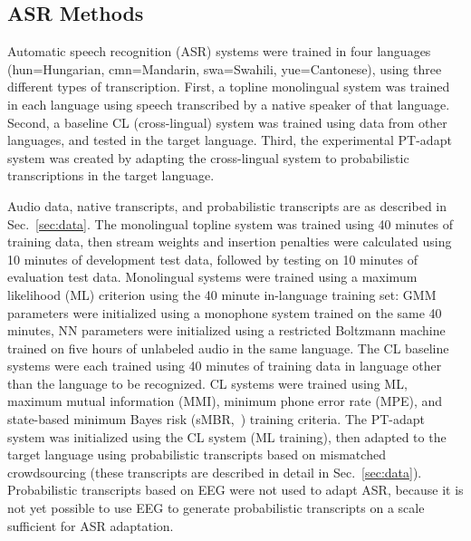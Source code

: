 \subsection{ASR Methods}
\label{sec:mlbaseline}

{\color{blue} Automatic speech recognition (ASR) systems were trained
  in four languages (hun=Hungarian, cmn=Mandarin, swa=Swahili,
  yue=Cantonese), using three different types of transcription.
  First, a topline {\sc monolingual} system was trained in each
  language using speech transcribed by a native speaker of that
  language.  Second, a baseline {\sc CL} (cross-lingual) system was
  trained using data from other languages, and tested in the target
  language.  Third, the experimental {\sc PT-adapt} system was created
  by adapting the cross-lingual system to probabilistic transcriptions
  in the target language.}

{\color{blue} Audio data, native transcripts, and probabilistic
  transcripts are as described in Sec.~\ref{sec:data}.  The {\sc
    monolingual} topline system was trained using 40 minutes of
  training data, then stream weights and insertion penalties were
  calculated using 10 minutes of development test data, followed by
  testing on 10 minutes of evaluation test data.  Monolingual systems
  were trained using a maximum likelihood (ML) criterion using the 40
  minute in-language training set: GMM parameters were initialized
  using a monophone system trained on the same 40 minutes, NN parameters
  were initialized using a restricted Boltzmann machine trained on
  five hours of unlabeled audio in the same language.
  The {\sc
    CL} baseline systems were each trained using 40 minutes of
  training data in language other than the language to be recognized.
  CL systems were trained using ML, maximum mutual information (MMI),
  minimum phone error rate (MPE), and state-based minimum Bayes risk
  (sMBR,~\cite{Gibson06}) training criteria.  The {\sc PT-adapt} system was initialized
  using the CL system (ML training), then adapted to the target
  language using probabilistic transcripts based on mismatched
  crowdsourcing (these transcripts are described in detail in
  Sec.~\ref{sec:data}).  Probabilistic transcripts based on EEG were
  not used to adapt ASR, because it is not yet possible to use EEG to
  generate probabilistic transcripts on a scale sufficient for ASR
  adaptation.}

